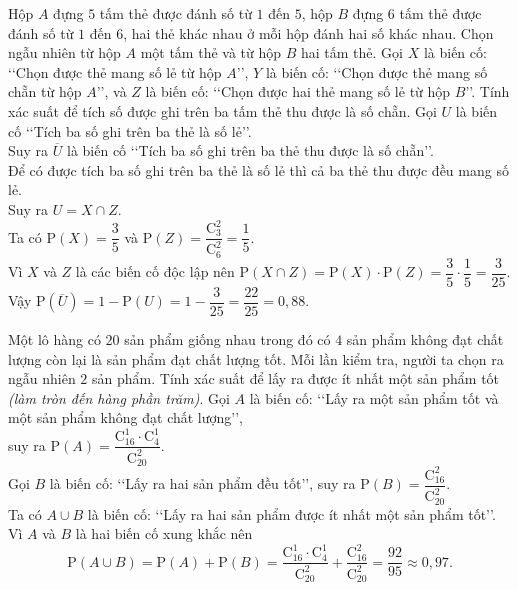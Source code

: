 \begin{ex}%
Hộp $A$ đựng $5$ tấm thẻ được đánh số từ $1$ đến $5$, hộp $B$ đựng $6$ tấm thẻ được đánh số từ $1$ đến $6$, hai thẻ khác nhau ở mỗi hộp đánh hai số khác nhau. Chọn ngẫu nhiên từ hộp $A$ một tấm thẻ và từ hộp $B$ hai tấm thẻ. Gọi $X$ là biến cố: \lq\lq Chọn được thẻ mang số lẻ từ hộp $A$\rq\rq, $Y$ là biến cố: \lq\lq Chọn được thẻ mang số chẵn từ hộp $A$\rq\rq, và $Z$ là biến cố: \lq\lq Chọn được hai thẻ mang số lẻ từ hộp $B$\rq\rq. Tính xác suất để tích số được ghi trên ba tấm thẻ thu được là số chẵn.
\loigiai
{
Gọi $U$ là biến cố \lq\lq Tích ba số ghi trên ba thẻ là số lẻ\rq\rq.\\
Suy ra $\overline{U}$ là biến cố \lq\lq Tích ba số ghi trên ba thẻ thu được là số chẵn\rq\rq.\\
Để có được tích ba số ghi trên ba thẻ là số lẻ thì cả ba thẻ thu được đều mang số lẻ.\\
Suy ra $U=X\cap Z$. \\
Ta có $\mathrm{P}(X)=\dfrac{3}{5}$ và $\mathrm{P}(Z)=\dfrac{\mathrm{C}_{3}^{2}}{\mathrm{C}_{6}^{2}}=\dfrac{1}{5}$. \\
Vì $X$ và $Z$ là các biến cố độc lập nên $\mathrm{P}(X\cap Z)=\mathrm{P}(X)\cdot\mathrm{P}(Z)=\dfrac{3}{5}\cdot\dfrac{1}{5}=\dfrac{3}{25}$.\\
Vậy $\mathrm{P}\left(\overline{U}\right)=1-\mathrm{P}(U)=1-\dfrac{3}{25}=\dfrac{22}{25}=0{,}88$.
}
\end{ex}

\begin{ex}%
Một lô hàng có $20$ sản phẩm giống nhau trong đó có $4$ sản phẩm không đạt chất lượng còn lại là sản phẩm đạt chất lượng tốt. Mỗi lần kiểm tra, người ta chọn ra ngẫu nhiên $2$ sản phẩm. Tính xác suất để lấy ra được ít nhất một sản phẩm tốt \textit{(làm tròn đến hàng phần trăm)}.
\loigiai
{
Gọi $A$ là biến cố: \lq\lq Lấy ra một sản phẩm tốt và một sản phẩm không đạt chất lượng\rq\rq, \\
suy ra $\mathrm{P}(A)=\dfrac{\mathrm{C}_{16}^{1}\cdot\mathrm{C}_{4}^{1}}{\mathrm{C}_{20}^{2}}$.\\
Gọi $B$ là biến cố: \lq\lq Lấy ra hai sản phẩm đều tốt\rq\rq, suy ra $\mathrm{P}(B)=\dfrac{\mathrm{C}_{16}^{2}}{\mathrm{C}_{20}^{2}}$.\\
Ta có $A\cup B$ là biến cố: \lq\lq Lấy ra hai sản phẩm được ít nhất một sản phẩm tốt\rq\rq.\\
Vì $A$ và $B$ là hai biến cố xung khắc nên
$$\mathrm{P}(A\cup B)=\mathrm{P}(A)+\mathrm{P}(B)=\dfrac{\mathrm{C}_{16}^{1}\cdot\mathrm{C}_{4}^{1}}{\mathrm{C}_{20}^{2}}+\dfrac{\mathrm{C}_{16}^{2}}{\mathrm{C}_{20}^{2}}=\dfrac{92}{95}\approx0{,}97.$$
}
\end{ex}

